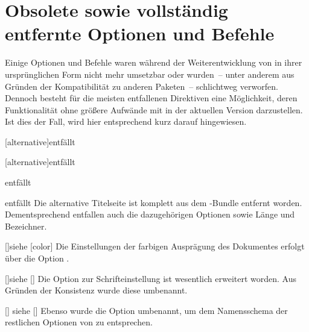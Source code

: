\chapter{Obsolete sowie vollständig entfernte Optionen und Befehle}
\label{sec:obsolete}%
%
Einige Optionen und Befehle waren während der Weiterentwicklung von \TUDScript
in ihrer ursprünglichen Form nicht mehr umsetzbar oder wurden~-- unter anderem 
aus Gründen der Kompatibilität zu anderen Paketen~-- schlichtweg verworfen. 
Dennoch besteht für die meisten entfallenen Direktiven eine Möglichkeit, deren 
Funktionalität ohne größere Aufwände mit \TUDScript in der aktuellen Version 
\vTUDScript{} darzustellen. Ist dies der Fall, wird hier entsprechend kurz 
darauf hingewiesen.

\begin{Declaration}{[alternative]}{entfällt}
\begin{Declaration}{[alternative]}{entfällt}
\begin{Declaration}{}{entfällt}
\begin{Declaration}{}{entfällt}
\printdeclarationlist*%
%
%
Die alternative Titelseite ist komplett aus dem \TUDScript-Bundle entfernt 
worden. Dementsprechend entfallen auch die dazugehörigen Optionen sowie Länge 
und Bezeichner.
\end{Declaration}
\end{Declaration}
\end{Declaration}
\end{Declaration}

\begin{Declaration}{[\PBoolean]}{siehe [color]}
\printdeclarationlist*%
%
Die Einstellungen der farbigen Ausprägung des Dokumentes erfolgt über die 
Option .
\end{Declaration}

\begin{Declaration}{[\PBoolean]}{siehe [\PSet]}
\printdeclarationlist*%
%
Die Option zur Schrifteinstellung ist wesentlich erweitert worden. Aus Gründen 
der Konsistenz wurde diese umbenannt.
\end{Declaration}

\begin{Declaration}{[\PBoolean]}{
  siehe [\PBoolean]%
}
\printdeclarationlist*%
%
Ebenso wurde die Option  umbenannt, um dem Namensschema der 
restlichen Optionen von \TUDScript zu entsprechen.
\end{Declaration}

